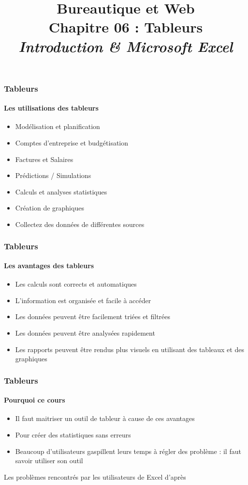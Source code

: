 \documentclass[xcolor=table, usenames,dvipsnames]{beamer}
\title[BWEB : 06- Tableurs et Excel] %
{Bureautique et Web \\Chapitre 06 : Tableurs \\ \slshape\small  Introduction \& Microsoft Excel}
\begin{document}
\begin{frame}
\frametitle{Tableurs}
\framesubtitle{Les utilisations des tableurs}
	\begin{itemize}
		\item Modélisation et planification
		\item Comptes d'entreprise et budgétisation
		\item Factures et Salaires
		\item Prédictions / Simulations
		\item Calculs et analyses statistiques
		\item Création de graphiques
		\item Collectez des données de différentes sources
	\end{itemize}
\end{frame}
	
\begin{frame}
\frametitle{Tableurs}
\framesubtitle{Les avantages des tableurs}
\begin{itemize}
	\item Les calculs sont corrects et automatiques
	\item L'information est organisée et facile à accéder
	\item Les données peuvent être facilement triées et filtrées
	\item Les données peuvent être analysées rapidement
	\item Les rapports peuvent être rendus plus visuels en utilisant des tableaux et des graphiques
\end{itemize}
\end{frame}

\begin{frame}
\frametitle{Tableurs}
\framesubtitle{Pourquoi ce cours}
\begin{minipage}{0.64\textwidth}
	\begin{itemize}
		\item Il faut maitriser un outil de tableur à cause de ces avantages
		\item Pour créer des statistiques sans erreurs 
		\item Beaucoup d'utilisateurs gaspillent leurs temps à régler des problème : il faut savoir utiliser son outil
	\end{itemize}
\end{minipage}
%
\begin{minipage}{0.35\textwidth}
	\begin{table}
		\caption{Les problèmes rencontrés par les utilisateurs de Excel d'après \cite{chambers}}
	\end{table}
\end{minipage}
\end{frame}
\end{document}

